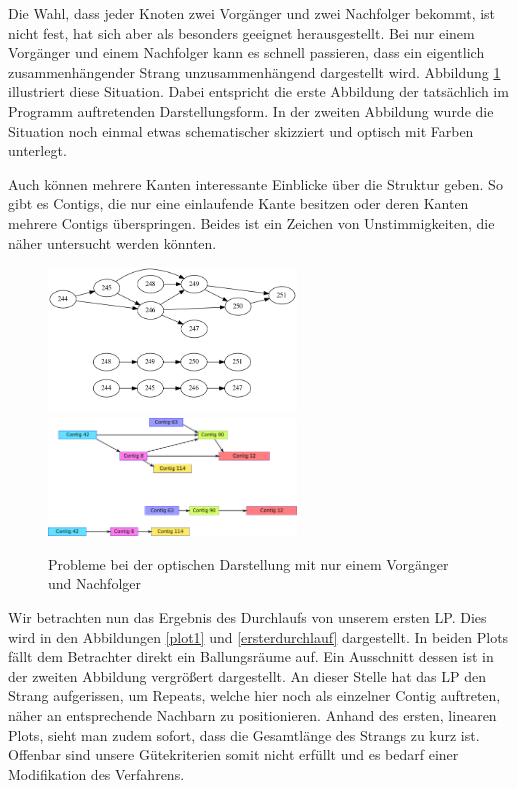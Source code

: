 Die Wahl, dass jeder Knoten zwei Vorgänger und zwei Nachfolger bekommt, ist nicht fest, hat sich aber als besonders geeignet herausgestellt. Bei nur einem Vorgänger und einem Nachfolger kann es schnell passieren, dass ein eigentlich zusammenhängender Strang unzusammenhängend dargestellt wird. Abbildung \ref{t} illustriert diese Situation. Dabei entspricht die erste Abbildung der tatsächlich im Programm auftretenden Darstellungsform. In der zweiten Abbildung wurde die Situation noch einmal etwas schematischer skizziert und optisch mit Farben unterlegt.

Auch können mehrere Kanten interessante Einblicke über die Struktur geben. So gibt es Contigs, die nur eine einlaufende Kante besitzen oder deren Kanten mehrere Contigs überspringen. 
Beides ist ein Zeichen von Unstimmigkeiten, die näher untersucht werden könnten.


\begin{figure}
	\begin{center}
		\includegraphics[width=6.6cm]{bilder/t}
		\includegraphics[width=6.6cm]{bilder/tt}
	\end{center}
	\caption{Probleme bei der optischen Darstellung mit nur einem Vorgänger und Nachfolger}
	\label{t}
\end{figure}


Wir betrachten nun das Ergebnis des Durchlaufs von unserem ersten LP. Dies wird in den Abbildungen \ref{plot1} und \ref{ersterdurchlauf} dargestellt. In beiden Plots fällt dem Betrachter direkt ein Ballungsräume auf. Ein Ausschnitt dessen ist in der zweiten Abbildung vergrößert dargestellt. An dieser Stelle hat das LP den Strang aufgerissen, um Repeats, welche hier noch als einzelner Contig auftreten, näher an entsprechende Nachbarn zu positionieren. Anhand des ersten, linearen Plots, sieht man zudem sofort, dass die Gesamtlänge des Strangs zu kurz ist.
Offenbar sind unsere Gütekriterien somit nicht erfüllt und es bedarf einer Modifikation des Verfahrens.


